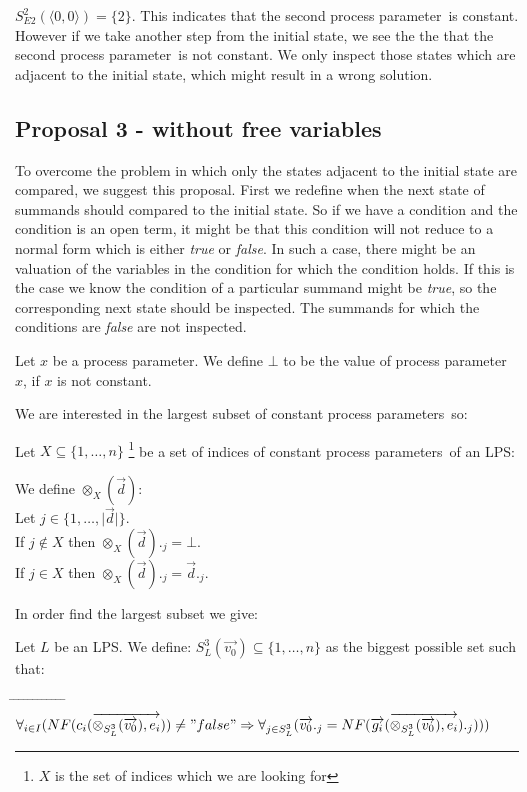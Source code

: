 \index{}\documentclass[a4paper,10pt]{article}
\theoremstyle{plain}
\theoremstyle{definition}
\newcommand{\ovr}{\overrightarrow}
\newcommand{\pp}{process parameter}
\newcommand{\pps}{process parameters}
\newcommand{\ti}{\textit}
\newcommand{\tab}{\hspace*{5.mm} \= \hspace*{5.mm} \= \hspace*{5.mm} \= \hspace*{5.mm} \= \hspace*{5.mm} \= \hspace*{5.mm}  \= \hspace*{5.mm}  \= \hspace*{5.mm}  \= \hspace*{5.mm} \= \hspace*{5.mm} \= \hspace*{5.mm}  \= \hspace*{5.mm}  \= \hspace*{5.mm}\kill}
\begin{document}
\begin{defn}
$S_{E2}^2(\langle 0,0 \rangle) = \lbrace 2 \rbrace$. This indicates that the second \pp\ is constant. However if we take another step from the initial state, we see the the that the second \pp\ is not constant. We only inspect those states which are adjacent to the initial state, which might result in a wrong solution.
\end{defn}

\subsection{Proposal 3 - without free variables}
To overcome the problem in which only the states adjacent to the initial state are compared, we suggest this proposal. First we redefine when the next state of summands should compared to the initial state. So if we have a condition and the condition is an open term, it might be that this condition will not reduce to a normal form which is either \ti{true} or \ti{false}. In such a case, there might be an valuation of the variables in the condition for which the condition holds. If this is the case we know the condition of a particular summand might be \ti{true}, so the corresponding next state should be inspected. The summands for which the conditions are \ti{false} are not inspected. \\

\begin{defn}[$\bot$] Let $x$ be a \pp . We define $\bot$ to be the value of \pp\ $x$, if $x$ is not constant.
\end{defn}

We are interested in the largest subset of constant \pps\ so:

Let $X \subseteq \lbrace 1, \ldots, n \rbrace$ \footnote{$X$ is the set of indices which we are looking for} be a set of indices of constant \pps\ of an LPS:

\begin{defn} We define $\otimes_X(\ovr{d})$:\\
Let $j \in \lbrace 1, \dots, \vert \ovr{d} \vert \rbrace $. \\
If $j \not\in X$ then $\otimes_X(\ovr{d})._j = \bot $. \\
If $j \in X$ then $\otimes_X(\ovr{d})._j = \ovr{d}._j$.\\
\end{defn}

In order find the largest subset we give:

\begin{defn} \label{def:sug3} Let $L$ be an LPS. We define: $ S_L^3(\ovr{v_0}) \subseteq \lbrace 1, \ldots, n \rbrace $
 as the biggest possible set such that:\\
\begin{tabbing}
\tab
\> $\forall_{i \in I} (NF( c_i ( \ovr{\otimes_{S_L^3}(\ovr{v_0}), e_i} ) ) \not= "false" \Rightarrow \forall_{j \in S_L^3}(\ovr{v_0}._j =  NF( \ovr{g_i}(\ovr{\otimes_{S_L^3}(\ovr{v_0}), e_i} )._j))) $
\end{tabbing}
\end{defn}
\end{document}
